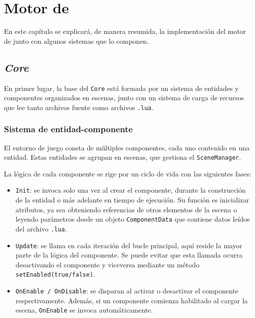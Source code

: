 \chapter{Motor de \baker}
\label{cap:motor}



\begin{resumen}
En este capítulo se explicará, de manera resumida, la implementación del motor de \baker{} junto con algunos sistemas que lo componen.
\end{resumen}

\section{\textit{Core}}
En primer lugar, la base del \texttt{Core} está formada por un sistema de entidades y componentes organizados en escenas, junto con un sistema de carga de recursos que lee tanto archivos fuente como archivos \texttt{.lua}.

\subsection{Sistema de entidad-componente}
El entorno de juego consta de múltiples componentes, cada uno contenido en una entidad. Estas entidades se agrupan en escenas, que gestiona el \texttt{SceneManager}.

\smallskip

La lógica de cada componente se rige por un ciclo de vida con las siguientes fases: 

\begin{itemize}
	\item \texttt{Init}: se invoca solo una vez al crear el componente, durante la construcción de la entidad o más adelante en tiempo de ejecución. Su función es inicializar atributos, ya sea obteniendo referencias de otros elementos de la escena o leyendo parámetros desde un objeto \texttt{ComponentData} que contiene datos leídos del archivo \texttt{.lua}.
	\item \texttt{Update}: se llama en cada iteración del bucle principal, aquí reside la mayor parte de la lógica del componente. Se puede evitar que esta llamada ocurra desactivando el componente y viceversa mediante un método \texttt{setEnabled(true/false)}.
	\item \texttt{OnEnable / OnDisable}: se disparan al activar o desactivar el componente respectivamente. Además, si un componente comienza habilitado al cargar la escena, \texttt{OnEnable} se invoca automáticamente.
\end{itemize}

